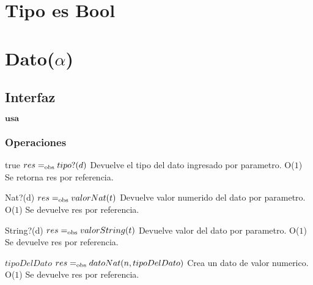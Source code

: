

\section{Tipo es Bool}


\section{Dato($\alpha$)}

\subsection{Interfaz}

$\textbf{usa}$  


\subsubsection*{Operaciones}



 {true}
 {$res =_{\mathrm{obs}} tipo?(d)$}
 {Devuelve el tipo del dato ingresado por parametro.}
 {O($1$)}
 {Se retorna res por referencia.}

 {Nat?(d)}
 {$res =_{\mathrm{obs}} valorNat(t)$}
 {Devuelve valor numerido del dato por parametro.}
 {O($1$)}
 {Se devuelve res por referencia.}

 {String?(d)}
 {$res =_{\mathrm{obs}} valorString(t)$}
 {Devuelve valor del dato por parametro.}
 {O($1$)}
 {Se devuelve res por referencia.}
 

 {$tipoDelDato$}
 {$res =_{\mathrm{obs}} datoNat(n,tipoDelDato)$}
 {Crea un dato de valor numerico.}
 {O($1$)}
 {Se devuelve res por referencia.}
 
